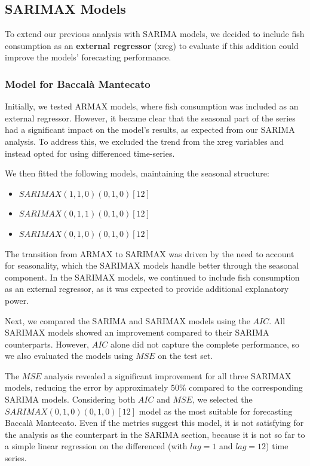 \documentclass[10pt,twocolumn,letterpaper]{article}
\begin{document}
\subsection{SARIMAX Models}
To extend our previous analysis with SARIMA models, we decided to include fish consumption as an \textbf{external regressor} (xreg) to evaluate if this addition could improve the models' forecasting performance.

\subsubsection{Model for Baccalà Mantecato}

Initially, we tested ARMAX models, where fish consumption was included as an external regressor.
However, it became clear that the seasonal part of the series had a significant impact on the model's results, as expected from our SARIMA analysis. To address this, we excluded the trend from the xreg variables and instead opted for using differenced time-series.

We then fitted the following models, maintaining the seasonal structure:
\begin{itemize}[noitemsep]
    \item $SARIMAX(1,1,0)(0,1,0)[12]$
    \item $SARIMAX(0,1,1)(0,1,0)[12]$
    \item $SARIMAX(0,1,0)(0,1,0)[12]$
\end{itemize}
The transition from ARMAX to SARIMAX was driven by the need to account for seasonality, which the SARIMAX models handle better through the seasonal component. In the SARIMAX models, we continued to include fish consumption as an external regressor, as it was expected to provide additional explanatory power.

Next, we compared the SARIMA and SARIMAX models using the $AIC$. All SARIMAX models showed an improvement compared to their SARIMA counterparts. However, $AIC$ alone did not capture the complete performance, so we also evaluated the models using $MSE$ on the test set.

The $MSE$ analysis revealed a significant improvement for all three SARIMAX models, reducing the error by approximately $50$\% compared to the corresponding SARIMA models. Considering both $AIC$ and $MSE$, we selected the $SARIMAX(0,1,0)(0,1,0)[12]$ model as the most suitable for forecasting Baccalà Mantecato. Even if the metrics suggest this model, it is not satisfying for the analysis as the counterpart in the SARIMA section, because it is not so far to a simple linear regression on the differenced (with $lag=1$ and $lag=12$) time series.
\end{document}
